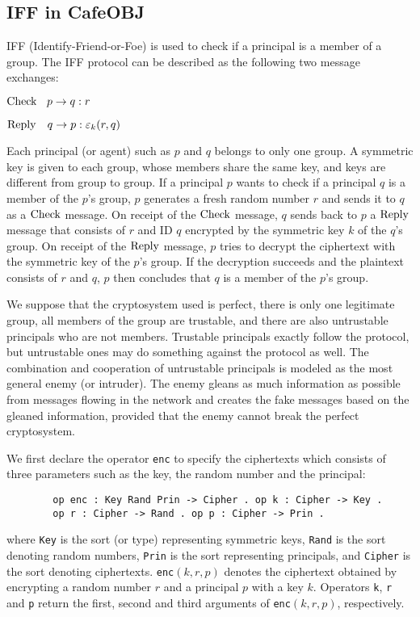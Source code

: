 \documentclass[a4paper,fleqn]{cas-dc}
\begin{document}
\subsection{IFF in CafeOBJ}
IFF (Identify-Friend-or-Foe) \cite{iff2001} is used to check if a principal is a member of a group. The IFF protocol can be described as the following two message exchanges:
	
	${\rm Check} \ \ \: p \rightarrow q : r$
	
	${\rm Reply}  \ \ \ q \rightarrow p : \varepsilon_k(r,q)$
	
	\noindent
Each principal (or agent) such as $p$ and $q$ belongs to only one group. A symmetric key is given to each group, whose members share the same key, and keys are different from group to group. If a principal $p$ wants to check if a principal $q$ is a member of the $p$'s group, $p$ generates a fresh random number $r$ and sends it to $q$ as a $\rm Check$ message. 
On receipt of the $\rm Check$ message, $q$ sends back to $p$ a $\rm Reply$ message that consists of $r$ and ID $q$ encrypted by the symmetric key $k$ of the $q$'s group. On receipt of the $\rm Reply$ message, $p$ tries to decrypt the ciphertext with the symmetric key of the $p$'s group. If the decryption succeeds and the plaintext consists of $r$ and $q$, $p$ then concludes that $q$ is a member of the $p$'s group. 
	
We suppose that the cryptosystem used is perfect, there is only one legitimate group, all members of the group are trustable, and there are also untrustable principals who are not members. Trustable principals exactly follow the protocol, but untrustable ones may do something against the protocol as well. The combination and cooperation of untrustable principals is modeled as the most general enemy (or intruder). The enemy gleans as much information as possible from messages flowing in the network and creates the fake messages based on the gleaned information, provided that the enemy cannot break the perfect cryptosystem.

We first declare the operator \verb!enc! to specify the ciphertexts which consists of three parameters such as the key, the random number and the principal:
\begin{small}
\begin{verbatim}
		op enc : Key Rand Prin -> Cipher . op k : Cipher -> Key .
		op r : Cipher -> Rand . op p : Cipher -> Prin .
		\end{verbatim}
\end{small}
	\smallskip
\noindent
where \verb!Key! is the sort (or type) representing symmetric keys, \verb!Rand! is the sort denoting random numbers, \verb!Prin! is the sort representing principals, and \verb!Cipher! is the sort denoting ciphertexts. \verb!enc!$(k,r,p)$ denotes the ciphertext obtained by encrypting a random number $r$ and a principal $p$ with a key $k$. Operators \verb!k!, \verb!r! and \verb!p! return the first, second and third arguments of \verb!enc!$(k, r, p)$, respectively.
	
\end{document}
